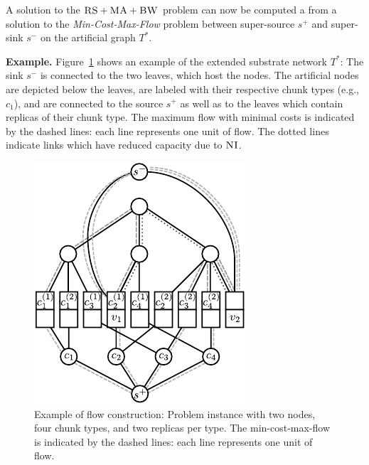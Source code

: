 \documentclass[preprint,12pt]{elsarticle}
\newcommand{\Source}{\ensuremath{s^{+}}}
\newcommand{\Sink}{\ensuremath{s^{-}}}
\newcommand{\achunk}{\ensuremath{c}}
\newcommand{\CC}{\textsc{NI}}
\newcommand{\FP}{\textsc{FP}}
\newcommand{\RS}{\textsc{RS}}
\newcommand{\BW}{\textsc{BW}}
\newcommand{\MA}{\textsc{MA}}
\newcommand{\Tree}{\ensuremath{T}}
\begin{document}
A solution to the $\RS+\MA+\BW$ problem can now be computed
a from a solution to the \emph{Min-Cost-Max-Flow} problem between super-source
$\Source$ and
super-sink $\Sink$ on the artificial graph $\Tree^*$.

\textbf{Example.} Figure~\ref{fig:flow_construction} shows an example of the extended substrate
network $\Tree^*$: The sink $\Sink$ is connected to the two leaves, which host the
nodes. The artificial nodes are depicted below the leaves, are labeled with
their respective chunk types (e.g., $\achunk_1$), and are connected to the source
$\Source$ as well as to the leaves which contain replicas of their chunk type.
The
maximum flow with minimal costs is indicated by the dashed lines: each line
represents one unit of flow. The dotted lines indicate links which have reduced
capacity due to $\CC$.

\begin{figure}
\centering
\includegraphics[width=0.65\columnwidth]{figs/flow_ma_cv}
\caption{Example of flow construction: Problem instance with two nodes, four chunk
types, and two replicas per type. The min-cost-max-flow
is indicated by the dashed lines: each line represents one unit of flow.
}
\vspace{-1em}
\label{fig:flow_construction}
\end{figure}
\end{document}
